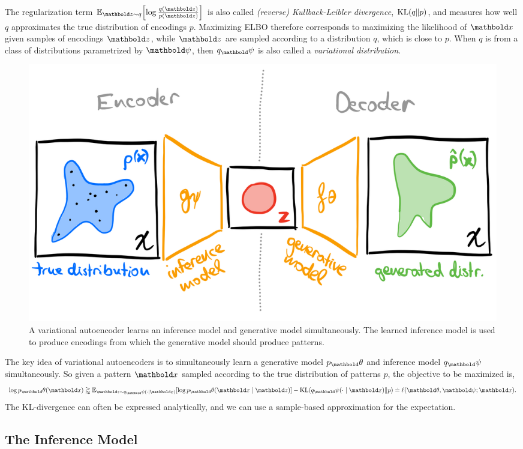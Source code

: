\documentclass{tufte-handout}
\begin{document}
The regularization term $\E[\vz \sim q]{\log \frac{q(\vz)}{p(\vz)}}$ is also called \emph{(reverse) Kullback-Leibler divergence}, $\KL{q}{p}$, and measures how well $q$ approximates the true distribution of encodings $p$. Maximizing ELBO therefore corresponds to maximizing the likelihood of $\vx$ given samples of encodings $\vz$, while $\vz$ are sampled according to a distribution $q$, which is close to $p$. When $q$ is from a class of distributions parametrized by $\vpsi$, then $q_\vpsi$ is also called a \emph{variational distribution}.

\begin{figure}
    \includegraphics[width=\textwidth]{figures/vae.png}
    \caption{A variational autoencoder learns an inference model and generative model simultaneously. The learned inference model is used to produce encodings from which the generative model should produce patterns.}
\end{figure}

The key idea of variational autoencoders is to simultaneously learn a generative model $p_\vtheta$ and inference model $q_\vpsi$ simultaneously. So given a pattern $\vx$ sampled according to the true distribution of patterns $p$, the objective to be maximized is, \begin{align}
    \log p_\vtheta(\vx) \gtrapprox  \E[\vz \sim q_\vpsi(\cdot \mid \vx)]{\log p_\vtheta(\vx \mid \vz)} - \KL{q_\vpsi(\cdot \mid \vx)}{p} \eqdef \ell(\vtheta, \vpsi; \vx).
\end{align} The KL-divergence can often be expressed analytically, and we can use a sample-based approximation for the expectation.

\subsection{The Inference Model}
\end{document}
